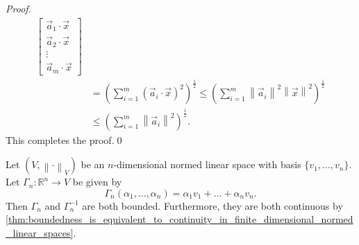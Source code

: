 \documentclass[notoc,notitlepage]{tufte-book}
\newcommand{\norm}[1]{\left\| #1 \right\|}
\begin{document}
\begin{proof}
\begin{align*}
{\begin{bmatrix}
                          \vec{a}_1 \cdot \vec{x} \\
                          \vec{a}_2 \cdot \vec{x} \\
                          \vdots \\
                          \vec{a}_m \cdot \vec{x}
                      \end{bmatrix} } \\
                  &= \left( \sum_{i=1}^{m} \left( \vec{a}_i \cdot \vec{x} \right)^2 \right)^\frac{1}{2} \leq \left( \sum_{i=1}^{m} \norm{\vec{a}_i}^2 \norm{\vec{x}}^2 \right)^\frac{1}{2} \\
                  &\leq \left( \sum_{i=1}^{m} \norm{ \vec{a}_i }^2 \right)^\frac{1}{2}.
  \end{align*}
  This completes the proof.\qed\
\end{proof}

\begin{thm}\label{thm:boundedness_of_functions_between_n_dimensional_vector_spaces_and_n_dimensional_normed_linear_spaces}
  Let $(V, \norm\cdot_V)$ be an $n$-dimensional normed linear space with basis $\{ v_1, \ldots, v_n \}$. Let $\Gamma_n : \mathbb{R}^n \to V$ be given by
  \begin{equation*}
    \Gamma_n(\alpha_1, \ldots, \alpha_n) = \alpha_1 v_1 + \hdots + \alpha_n v_n.
  \end{equation*}
  Then $\Gamma_n$ and $\Gamma_n^{-1}$ are both bounded. Furthermore, they are both continuous by \cref{thm:boundedness_is_equivalent_to_continuity_in_finite_dimensional_normed_linear_spaces}.
\end{thm}
\end{document}
